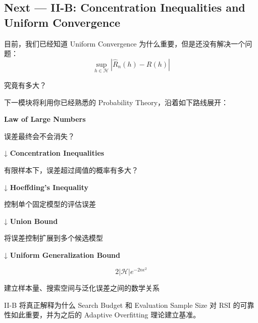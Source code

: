 \hypertarget{part-2-12-0001-next-ii-b-concentration-inequalities-and-uniform-convergence}{%
\subsection{Next --- II-B: Concentration Inequalities and Uniform Convergence}\label{part-2-12-0001-next-ii-b-concentration-inequalities-and-uniform-convergence}}

目前，我们已经知道 Uniform Convergence 为什么重要，但是还没有解决一个问题：
\[\sup_{h\in\mathcal H}
|\widehat R_n(h)-R(h)|\]

究竟有多大？

下一模块将利用你已经熟悉的 Probability Theory，沿着如下路线展开：

\textbf{Law of Large Numbers}

误差最终会不会消失？

↓ \textbf{Concentration Inequalities}

有限样本下，误差超过阈值的概率有多大？

↓ \textbf{Hoeffding's Inequality}

控制单个固定模型的评估误差

↓ \textbf{Union Bound}

将误差控制扩展到多个候选模型

↓ \textbf{Uniform Generalization Bound}

\[2|\mathcal H|e^{-2n\epsilon^2}\]

建立样本量、搜索空间与泛化误差之间的数学关系

II-B 将真正解释为什么 Search Budget 和 Evaluation Sample Size 对 RSI 的可靠性如此重要，并为之后的 Adaptive Overfitting 理论建立基准。
